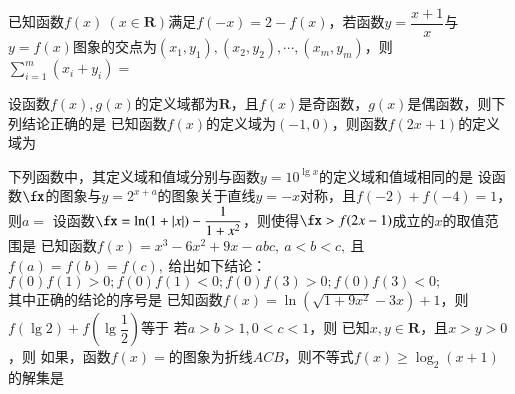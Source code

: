 \documentclass[marginline,noindent,answers,adobefonts]{BHCexam}
\begin{document}
\fubiaoti{}
\maketitle
\begin{questions}
\question
已知函数$f(x)~(x\in \mathbf{R})$满足$f(-x)=2-f(x)$，若函数$y=\dfrac{x+1}{x}$与$y=f(x)$图象的交点为$(x_1,y_1),(x_2,y_2),\cdots,(x_m,y_m)$，则$\sum\limits_{i=1}^{m}(x_i+y_i)=$\xx
{}

\question
设函数$f(x),g(x)$的定义域都为$\mathbf{R}$，且$f(x)$是奇函数，$g(x)$是偶函数，则下列结论正确的是\xx
{}
\question
已知函数$f(x)$的定义域为$(-1,0)$，则函数$f(2x+1)$的定义域为\xx
{}

\qs 下列函数中，其定义域和值域分别与函数$y=10^{\lg x}$的定义域和值域相同的是\xx
{}
\qs
设函数$\fx$的图象与$y=2^{x+a}$的图象关于直线$y=-x$对称，且$f(-2)+f(-4)=1$，则$a=$\mbox{\hspace{1pt}}\hfill\xx
{}
\qs 设函数$\fx=\ln (1+\abs{x})-\dfrac{1}{1+x^2}$，则使得$\fx>f(2x-1)$成立的$x$的取值范围是\xx
{}
\qs 已知函数$f(x)=x^3-6x^2+9x-abc,~a<b<c,~$且$ f(a)=f(b)=f(c) ,~$给出如下结论：\\
 $ f(0)f(1)>0 ;$\quad {}$f(0)f(1)<0;$\quad {}$f(0)f(3)>0;$\quad {}$f(0)f(3)<0;$\\
其中正确的结论的序号是\xx
{}
\qs 已知函数$f(x)=\ln \left(\sqrt{1+9x^2}-3x\right)+1$，则$ f(\lg2)+f\left(\lg\dfrac{1}{2}\right) $等于\xx
{}
\qs 若$ a>b>1,0<c<1 $，则\xx
{}
\qs 已知$ x,y\in \mathbf{R} $，且$ x>y>0 $，则\xx
{}
\qs 如果，函数$f(x)=$的图象为折线$ ACB $，则不等式$ f(x)\ge \log_2(x+1) $的解集是\xx


\end{questions}
\end{document}
